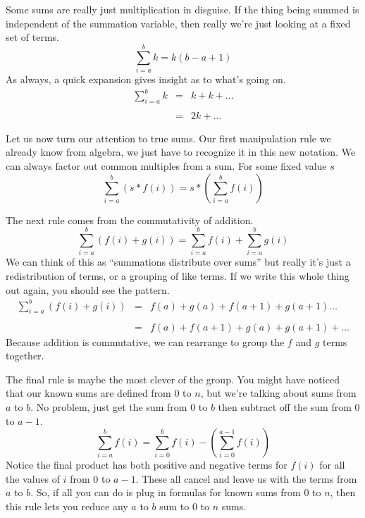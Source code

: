 \documentclass[]{tufte-handout}
\begin{document}
Some sums are really just multiplication in disguise.  If the thing being summed is independent of the summation variable, then really we're just looking at a fixed set of terms.
\begin{equation}
\sum\limits_{i=a}^{b}k = k(b-a+1)
\end{equation}
As always, a quick expansion gives insight as to what's going on.
\begin{equation*}
\begin{array}{rcl}
\sum\limits_{i=a}^{b}k &=& k + k + \ldots \\ \\
&=& 2k + \ldots
\end{array}
\end{equation*}

Let us now turn our attention to true sums. Our first manipulation rule we already know from algebra, we just have to recognize it in this new notation. We can always factor out common multiples from a sum. For some fixed value $s$
\begin{equation}
\sum\limits_{i=a}^{b}(s*f(i)) = s*\left(\sum\limits_{i=a}^{b}f(i)\right)
\end{equation}


The next rule comes from the commutativity of addition.  
\begin{equation}
\sum\limits_{i=a}^{b}(f(i)+g(i)) =\sum\limits_{i=a}^{b}f(i) + \sum\limits_{i=a}^{b}g(i)
\end{equation}
We can think of this as ``summations distribute over sums'' but really it's just a redistribution of terms, or a grouping of like terms.  If we write this whole thing out again, you should see the pattern.
\begin{equation*}
\begin{array}{rcl}
\sum\limits_{i=a}^{b}(f(i)+g(i)) &=& f(a)+g(a)+f(a+1)+g(a+1) \ldots \\ \\
 &=& f(a) + f(a+1) + g(a) + g(a+1) + \ldots
\end{array}
\end{equation*}
Because addition is commutative, we can rearrange to group the $f$ and $g$ terms together.

The final rule is maybe the most clever of the group. You might have noticed that our known sums are defined from 0 to $n$, but we're talking about sums from $a$ to $b$. No problem, just get the sum from 0 to $b$ then subtract off the sum from $0$ to $a-1$. 
\begin{equation}
\sum\limits_{i=a}^{b}f(i) = \sum\limits_{i=0}^{b} f(i) - \left( \sum\limits_{i=0}^{a-1} f(i)  \right)
\end{equation}
Notice the final product has both positive and negative terms for $f(i)$ for all the values of $i$ from 0 to $a-1$.  These all cancel and leave us with the terms from $a$ to $b$.  So, if all you can do is plug in formulas for known sums from $0$ to $n$, then this rule lets you reduce any $a$ to $b$ sum to $0$ to $n$ sums.
\end{document}
